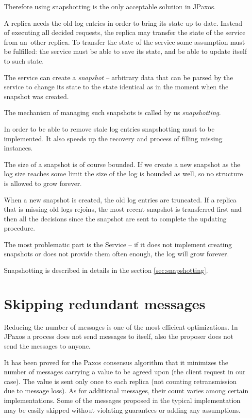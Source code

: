 Therefore using snapshotting is the only acceptable solution in JPaxos.


A replica needs the old log entries in order to bring its state up to date. Instead of executing all decided requests, the replica may transfer the state of the service from an~other replica. To transfer the state of the service some assumption must be fulfilled: the service must be able to save its state, and be able to update itself to such state.

The service can create a \textit{snapshot} -- arbitrary data that can be parsed by the service to change its state to the state identical as in the moment when the snapshot was created.

The mechanism of managing such snapshots is called by us \textit{snapshotting}.

In order to be able to remove stale log entries snapshotting must to be implemented. It also speeds up the recovery and process of filling missing instances.

The size of a snapshot is of course bounded. If we create a new snapshot as the log size reaches some limit the size of the log is bounded as well, so no structure is allowed to grow forever.

When a new snapshot is created, the old log entries are truncated. If a replica that is missing old logs rejoins, the most recent snapshot is transferred first and then all the decisions since the snapshot are sent to complete the updating procedure.

The most problematic part is the Service -- if it does not implement creating snapshots or does not provide them often enough, the log will grow forever.

Snapshotting is described in details in the section \ref{sec:snapshotting}.

\section{Skipping redundant messages}
Reducing the number of messages is one of the most efficient optimizations. In JPaxos a process does not send messages to itself, also the proposer does not send the \accept messages to anyone.

It has been proved for the Paxos consensus algorithm that it minimizes the number of messages carrying a value to be agreed upon (the client request in our case). The value is sent only once to each replica (not counting retransmission due to message loss). \linebreak As for additional messages, their count varies among certain implementations. Some of the messages proposed in the typical implementation may be easily skipped without violating guarantees or adding any assumptions.

